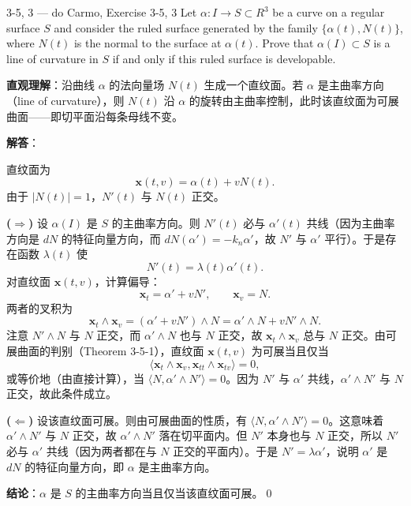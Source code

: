 \begin{exercise}{3-5, 3 — do Carmo, Exercise 3-5, 3}
Let $\alpha \colon I \to S \subset R^3$ be a curve on a regular surface $S$ and consider the ruled surface generated by the family $\{\alpha(t), N(t)\}$, where $N(t)$ is the normal to the surface at $\alpha(t)$. Prove that $\alpha(I) \subset S$ is a line of curvature in $S$ if and only if this ruled surface is developable.
\end{exercise}

\begin{solution}
\textbf{直观理解}：沿曲线 $\alpha$ 的法向量场 $N(t)$ 生成一个直纹面。若 $\alpha$ 是主曲率方向（line of curvature），则 $N(t)$ 沿 $\alpha$ 的旋转由主曲率控制，此时该直纹面为可展曲面——即切平面沿每条母线不变。

\textbf{解答}：

直纹面为
\[
\mathbf{x}(t,v) = \alpha(t) + v N(t).
\]
由于 $|N(t)|=1$，$N'(t)$ 与 $N(t)$ 正交。

\textbf{($\Rightarrow$)} 设 $\alpha(I)$ 是 $S$ 的主曲率方向。则 $N'(t)$ 必与 $\alpha'(t)$ 共线（因为主曲率方向是 $dN$ 的特征向量方向，而 $dN(\alpha') = -k_n \alpha'$，故 $N'$ 与 $\alpha'$ 平行）。于是存在函数 $\lambda(t)$ 使
\[
N'(t) = \lambda(t) \alpha'(t).
\]
对直纹面 $\mathbf{x}(t,v)$，计算偏导：
\[
\mathbf{x}_t = \alpha' + v N',\qquad \mathbf{x}_v = N.
\]
两者的叉积为
\[
\mathbf{x}_t\wedge\mathbf{x}_v = (\alpha'+vN')\wedge N = \alpha'\wedge N + vN'\wedge N.
\]
注意 $N'\wedge N$ 与 $N$ 正交，而 $\alpha'\wedge N$ 也与 $N$ 正交，故 $\mathbf{x}_t\wedge\mathbf{x}_v$ 总与 $N$ 正交。由可展曲面的判别（Theorem 3-5-1），直纹面 $\mathbf{x}(t,v)$ 为可展当且仅当
\[
\langle \mathbf{x}_t\wedge\mathbf{x}_v, \mathbf{x}_{tt}\wedge\mathbf{x}_{tv}\rangle = 0,
\]
或等价地（由直接计算），当 $\langle N, \alpha'\wedge N'\rangle = 0$。因为 $N'$ 与 $\alpha'$ 共线，$\alpha'\wedge N'$ 与 $N$ 正交，故此条件成立。

\textbf{($\Leftarrow$)} 设该直纹面可展。则由可展曲面的性质，有 $\langle N, \alpha'\wedge N'\rangle = 0$。这意味着 $\alpha'\wedge N'$ 与 $N$ 正交，故 $\alpha'\wedge N'$ 落在切平面内。但 $N'$ 本身也与 $N$ 正交，所以 $N'$ 必与 $\alpha'$ 共线（因为两者都在与 $N$ 正交的平面内）。于是 $N' = \lambda \alpha'$，说明 $\alpha'$ 是 $dN$ 的特征向量方向，即 $\alpha$ 是主曲率方向。

\textbf{结论}：$\alpha$ 是 $S$ 的主曲率方向当且仅当该直纹面可展。\qed
\end{solution}

